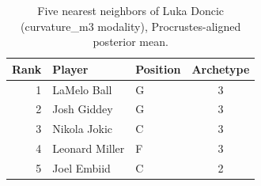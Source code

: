 \begin{table}[htbp]
  \centering\small
  \begin{tabular}{rllc}
    \toprule
    Rank & Player & Position & Archetype \\
    \midrule
    1 & LaMelo Ball & G & 3 \\
    2 & Josh Giddey & G & 3 \\
    3 & Nikola Jokic & C & 3 \\
    4 & Leonard Miller & F & 3 \\
    5 & Joel Embiid & C & 2 \\
    \bottomrule
  \end{tabular}
  \caption{Five nearest neighbors of Luka Doncic (curvature_m3 modality), Procrustes-aligned posterior mean.}
  \label{tab:Luka_Doncic_neighbors_curvature_m3}
\end{table}


